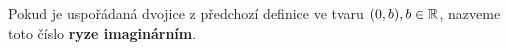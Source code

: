 \begin{definition}
  Pokud je uspořádaná dvojice z předchozí definice ve tvaru $(0, b), b \in \mathbb{R}$, nazveme toto číslo \textbf{ryze imaginárním}.
\end{definition}

\begin{comment}


\begin{example}[SÚM 169/8]
  Označme $M$ množinu všech dvojciferných přirozených čísel delitelných šesti a $N$ všechn dělitelů čísla 210, kteří jsou různí od čísla 1 a 210. Určete, která z množin má větší počet prvků, a vypište všechny prvky, které mají obě množiny stejné.
  \begin{align*}
    M & = \left\{12, 18, 24, 30, 36, 42, 48, 54, 60, 66, 72, 78, 84, 90, 96\right\}\\
    210 & = 2\cdot 3 \cdot 5  \cdot 7 \textrm{ -- hledáme násobky všech podmnožin těchto čísel} \\
    N  & = \left\{2,3,5,6,7, 10, 14, 15, 21, 30, 35, 42, 70, 105\right\} \\
    |M| & = 15, |N| = 14, M \cap N = \left\{30, 42\right\}
  \end{align*}

  \rm Množina $M$ má více prvků a společná jsou čísla 30 a 42.
\end{example}

\begin{example}[SÚM 171/26]
  $M$ je množina šech reálných čísel $x$, která splňují nerovnosti $-2<x<5$, $N$ je mn. všech reálných čísel $y$, která splňují nerovnost $|y|<4$. Určete množinu $R=M\cup N$ a $S = M\cap N.$ \hfill $R = (-4,5), S=(-2,4).$
\end{example}

\begin{example}[SÚM 172/29f]
  Znázorněte a určete výsledný interval: $(a,a+2)\cap (a-1,a+1),$ kde $a>0.$\hfill$(a,a+1)$
\end{example}

\begin{example}[SÚM (172/33)]
  Je dána kružnice $k$ se středem v bodě  $S$ a poloměrem $r$. Množinu všech bodů uvnitř kružnice označte $A$. Nakreslete rovnostranný trojúhelník $ESD$, jehož jeden vrchol je ve středu dané kružnice a délky stran jsou rovny velikosti jejího průměru. Množinu vnitřních bodů tohoto trojúhelníka ozn. $B$. Díle sestrojte osu úhlu $ESD$ a množinu bodů této přímky označte $C$. Nakreslete samostatné obrázky pro:
  \begin{itemize}
    \item $(A\cap B)\cup C,$
    \item $(A\cup C) \cap (B\cup C),$
    \item $(A\cap B) \cup (B\cap C),$
    \item $(A\cup C) \cap B$.
  \end{itemize}
\end{example}


\end{comment}
